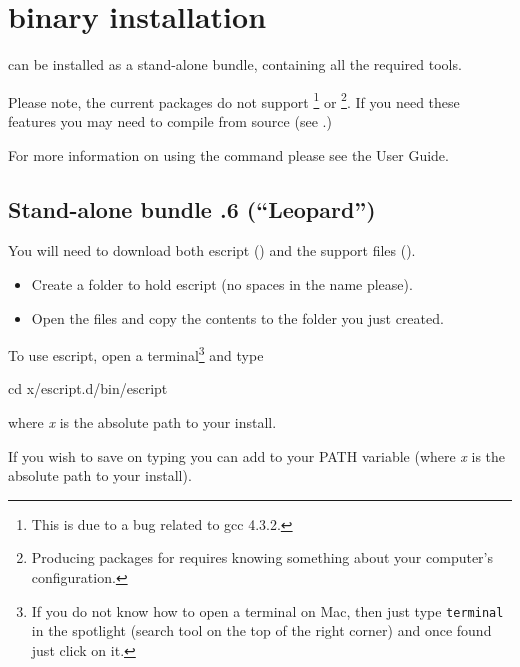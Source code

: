 %
%
%

\section{\macosx binary installation}
\label{sec:binmac}

\esfinley can be installed as a stand-alone bundle, containing all the required tools.

Please note, the current packages do not support \openmp\footnote{This is due to a bug related to gcc 4.3.2.} or \mpi\footnote{Producing packages for \mpi requires knowing something about your computer's configuration.}.
If you need these features you may need to compile \esfinley from source (see .)

For more information on using the  command please see the User Guide.

\subsection{Stand-alone bundle .6 (``Leopard'')}

You will need to download both escript () and the support files ().
\begin{itemize}
\item Create a folder to hold escript (no spaces in the name please).
\item Open the  files and copy the contents to the folder you just created.
\end{itemize}

To use escript, open a terminal\footnote{If you do not know how to open a terminal on Mac, then just type \texttt{terminal} in the spotlight (search tool on the top of the right corner) and once found just click on it.} and type
\begin{shellCode}
cd x/escript.d/bin/escript
\end{shellCode}
where \textit{x} is the absolute path to your install.

If you wish to save on typing you can add  to your PATH variable (where \textit{x} is the absolute path to your install). 



